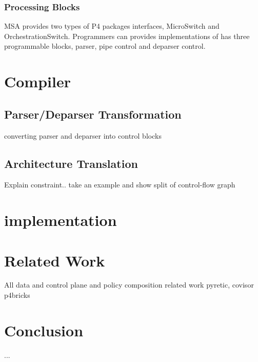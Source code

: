 \documentclass[10pt,sigconf,letterpaper,anonymous]{acmart}
\begin{document}
\begin{figure}
\end{figure}

\subsubsection{Processing Blocks}
MSA provides two types of P4 packages interfaces, MicroSwitch and OrchestrationSwitch.
Programmers can provides implementations of 
has three programmable blocks, parser, pipe control and deparser control. 



\section{Compiler}

\subsection{Parser/Deparser Transformation}
converting parser and deparser into control blocks

\subsection{Architecture Translation}
Explain constraint.. take an example and show split of control-flow graph



\section{implementation}

\section{Related Work}

All data and control plane and policy composition related work 
pyretic, covisor
p4bricks
\section{Conclusion}

\begin{acks}
...
\end{acks}




\end{document}
